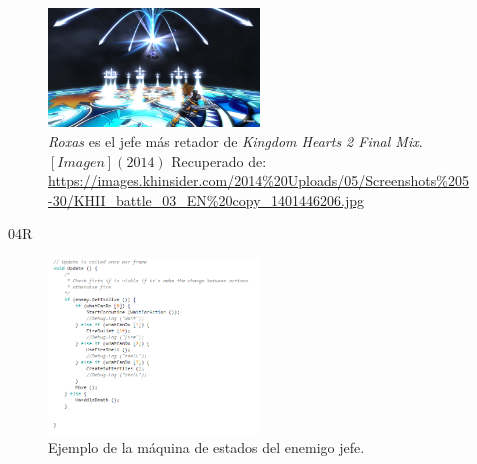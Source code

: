             \begin{figure}[h]
                \centering
                \includegraphics[width=0.5\textwidth]{03TrabajoRealizado/imagenes/RoxasBoss.jpg}
                \caption{\textit{Roxas} es el jefe más retador de \textit{Kingdom Hearts 2 Final Mix}. $ [Imagen] (2014)$ Recuperado de: \url{https://images.khinsider.com/2014\%20Uploads/05/Screenshots\%205-30/KHII_battle_03_EN\%20copy_1401446206.jpg}}
                \label{fig:Roxas}
            \end{figure}04R

            \begin{figure}[h]
                \centering
                \includegraphics[width=0.5\textwidth]{03TrabajoRealizado/imagenes/ActualMaquinaJefe.png}
                \caption{Ejemplo de la máquina de estados del enemigo jefe.}
                \label{fig:EnemyMaquina}
            \end{figure}

